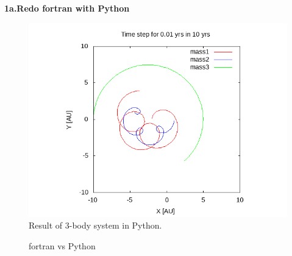 \documentclass{article}
\begin{document}
\textbf{1a.Redo fortran with Python}\\
\begin{figure}[h]
    \centering 
	\includegraphics[scale=0.5]{pro1_result.png}
	\caption{Result of 3-body system in Python.} %
	\label{fig.pro1a} %
\end{figure}

\begin{figure}[h]
    \centering
    \caption{fortran vs Python}
    \label{fig.pro1a_}
\end{figure}
\end{document}
